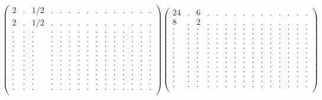 \documentclass[12pt,a4paper]{amsart}
\begin{document}
\begin{align*}
\left(\begin{array}{rrrrrrrrrrrrrrr}%
2&.&1/2&.&.&.&.&.&.&.&.&.&.&.&.\\%
2&.&1/2&.&.&.&.&.&.&.&.&.&.&.&.\\%
.&.&.&.&.&.&.&.&.&.&.&.&.&.&.\\%
.&.&.&.&.&.&.&.&.&.&.&.&.&.&.\\%
.&.&.&.&.&.&.&.&.&.&.&.&.&.&.\\%
.&.&.&.&.&.&.&.&.&.&.&.&.&.&.\\%
.&.&.&.&.&.&.&.&.&.&.&.&.&.&.\\%
.&.&.&.&.&.&.&.&.&.&.&.&.&.&.\\%
.&.&.&.&.&.&.&.&.&.&.&.&.&.&.\\%
.&.&.&.&.&.&.&.&.&.&.&.&.&.&.\\%
.&.&.&.&.&.&.&.&.&.&.&.&.&.&.\\%
.&.&.&.&.&.&.&.&.&.&.&.&.&.&.\\%
.&.&.&.&.&.&.&.&.&.&.&.&.&.&.\\%
.&.&.&.&.&.&.&.&.&.&.&.&.&.&.\\%
.&.&.&.&.&.&.&.&.&.&.&.&.&.&.\\%
\end{array}\right)%
\left(\begin{array}{rrrrrrrrrrrrrrr}%
24&.&6&.&.&.&.&.&.&.&.&.&.&.&.\\%
8&.&2&.&.&.&.&.&.&.&.&.&.&.&.\\%
.&.&.&.&.&.&.&.&.&.&.&.&.&.&.\\%
.&.&.&.&.&.&.&.&.&.&.&.&.&.&.\\%
.&.&.&.&.&.&.&.&.&.&.&.&.&.&.\\%
.&.&.&.&.&.&.&.&.&.&.&.&.&.&.\\%
.&.&.&.&.&.&.&.&.&.&.&.&.&.&.\\%
.&.&.&.&.&.&.&.&.&.&.&.&.&.&.\\%
.&.&.&.&.&.&.&.&.&.&.&.&.&.&.\\%
.&.&.&.&.&.&.&.&.&.&.&.&.&.&.\\%
.&.&.&.&.&.&.&.&.&.&.&.&.&.&.\\%
.&.&.&.&.&.&.&.&.&.&.&.&.&.&.\\%
.&.&.&.&.&.&.&.&.&.&.&.&.&.&.\\%
.&.&.&.&.&.&.&.&.&.&.&.&.&.&.\\%
.&.&.&.&.&.&.&.&.&.&.&.&.&.&.\\%
\end{array}\right)%
\end{align*}
\end{document}
